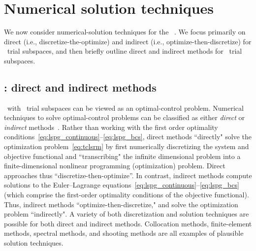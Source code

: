 \section{Numerical solution techniques}\label{sec:numerical_techniques}
We now consider numerical-solution techniques for the \methodAcronym\ \approachKwd.
We focus primarily on 
direct (i.e., discretize-the-optimize) and indirect (i.e., optimize-then-discretize) for \spatialAcronym\ trial subspaces, 
and then briefly outline direct and indirect methods for \spaceTimeAcronym\ trial subspaces. 
\subsection{\spatialAcronym: direct and indirect methods}
\methodAcronym\ with \spatialAcronym\ trial subspaces can be viewed as an optimal-control problem.
Numerical techniques to
solve optimal-control problems can be classified as either
\textit{direct} or \textit{indirect}
methods~\cite{conway_optimalcontrolreview}. Rather than working with the first order optimality conditions~\eqref{eq:lspg_continuous}--\eqref{eq:lspg_bcs}, direct methods ``directly" solve the optimization problem~\eqref{eq:tclsrm} by first
numerically discretizing the system and objective functional and ``transcribing"
the infinite dimensional problem into a finite-dimensional nonlinear
programming (optimization) problem. Direct approaches thus
``discretize-then-optimize''.
In contrast, indirect methods compute solutions to the Euler--Lagrange equations~\eqref{eq:lspg_continuous}--\eqref{eq:lspg_bcs} (which comprise the first-order optimality conditions of the objective functional). Thus, indirect methods ``optimize-then-discretize," and solve the optimization problem
``indirectly". A variety of both discretization and solution techniques are possible
for both direct and indirect methods. Collocation methods,
finite-element methods, spectral methods, and shooting methods are all examples of
plausible solution techniques.  

